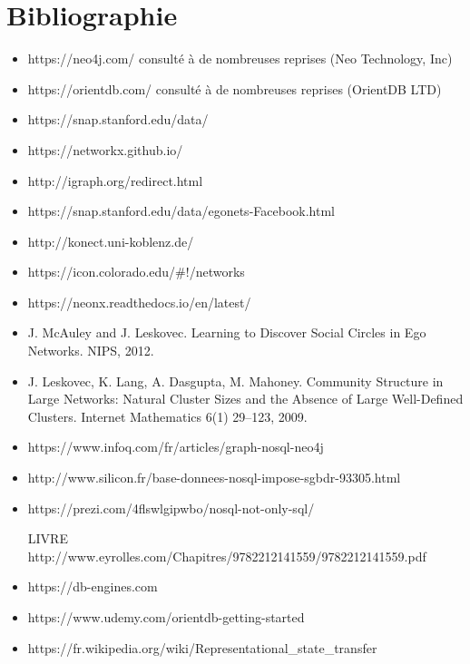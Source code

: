 \documentclass[a4paper,fleqn,12pt]{report}
\begin{document}
\chapter*{Bibliographie}
\begin{itemize}
\item https://neo4j.com/ consulté à de nombreuses reprises (Neo Technology, Inc)
\item https://orientdb.com/ consulté à de nombreuses reprises (OrientDB LTD)
\item https://snap.stanford.edu/data/
\item https://networkx.github.io/
\item http://igraph.org/redirect.html
\item https://snap.stanford.edu/data/egonets-Facebook.html
\item http://konect.uni-koblenz.de/
\item https://icon.colorado.edu/\#!/networks
\item https://neonx.readthedocs.io/en/latest/
\item J. McAuley and J. Leskovec. Learning to Discover Social Circles in Ego Networks. NIPS, 2012.
\item J. Leskovec, K. Lang, A. Dasgupta, M. Mahoney. Community Structure in Large Networks: Natural Cluster Sizes and the Absence of Large Well-Defined Clusters. Internet Mathematics 6(1) 29--123, 2009.
\item https://www.infoq.com/fr/articles/graph-nosql-neo4j
\item http://www.silicon.fr/base-donnees-nosql-impose-sgbdr-93305.html
\item https://prezi.com/4flswlgipwbo/nosql-not-only-sql/
\item [LIVRE] http://www.eyrolles.com/Chapitres/9782212141559/9782212141559.pdf
\item https://db-engines.com
\item https://www.udemy.com/orientdb-getting-started
\item https://fr.wikipedia.org/wiki/Representational\_state\_transfer
\end{itemize}
\end{document}
